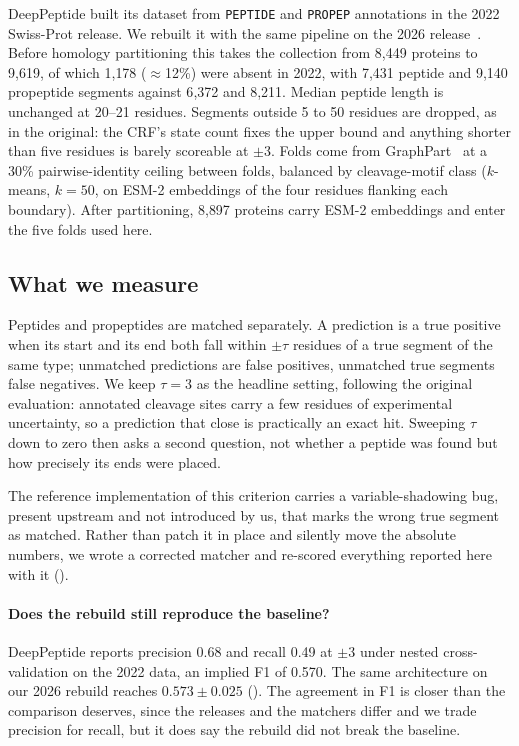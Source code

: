 \documentclass{article}
\begin{document}
DeepPeptide built its dataset from \texttt{PEPTIDE} and \texttt{PROPEP} annotations in the 2022 Swiss-Prot release. We rebuilt it with the same pipeline on the 2026 release~\citep{uniprot2025}. Before homology partitioning this takes the collection from 8{,}449 proteins to 9{,}619, of which 1{,}178 ($\approx$12\%) were absent in 2022, with 7{,}431 peptide and 9{,}140 propeptide segments against 6{,}372 and 8{,}211. Median peptide length is unchanged at 20--21 residues. Segments outside 5 to 50 residues are dropped, as in the original: the CRF's state count fixes the upper bound and anything shorter than five residues is barely scoreable at $\pm3$. Folds come from GraphPart~\citep{graphpart2023} at a 30\% pairwise-identity ceiling between folds, balanced by cleavage-motif class ($k$-means, $k=50$, on ESM-2 embeddings of the four residues flanking each boundary). After partitioning, 8{,}897 proteins carry ESM-2 embeddings and enter the five folds used here.

\subsection{What we measure}
\label{sec:matching}

Peptides and propeptides are matched separately. A prediction is a true positive when its start and its end both fall within $\pm\tau$ residues of a true segment of the same type; unmatched predictions are false positives, unmatched true segments false negatives. We keep $\tau=3$ as the headline setting, following the original evaluation: annotated cleavage sites carry a few residues of experimental uncertainty, so a prediction that close is practically an exact hit. Sweeping $\tau$ down to zero then asks a second question, not whether a peptide was found but how precisely its ends were placed.

The reference implementation of this criterion carries a variable-shadowing bug, present upstream and not introduced by us, that marks the wrong true segment as matched. Rather than patch it in place and silently move the absolute numbers, we wrote a corrected matcher and re-scored everything reported here with it ().

\paragraph{Does the rebuild still reproduce the baseline?} DeepPeptide reports precision 0.68 and recall 0.49 at $\pm3$ under nested cross-validation on the 2022 data, an implied F1 of 0.570. The same architecture on our 2026 rebuild reaches $0.573\pm0.025$ (). The agreement in F1 is closer than the comparison deserves, since the releases and the matchers differ and we trade precision for recall, but it does say the rebuild did not break the baseline.
\end{document}
